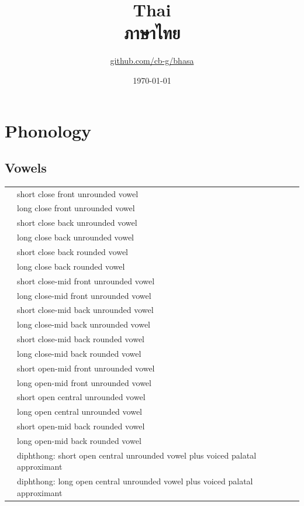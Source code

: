 \documentclass{article}
\title{Thai\\{\thaifont ภาษาไทย}\\\ipa{[p\super ha:\tone{333}sa:\tone{324}t\super haj\tone{333}]}}
\author{\href{https://github.com/cb-g/bhasa}{github.com/cb-g/bhasa}}
\date{\today}
\begin{document}
\pagecolor{custom_bg}\color{custom_fg}
\maketitle\thispagestyle{empty}

\newpage\setcounter{page}{1}\section{Phonology}

\subsection{Vowels}

\begin{xltabular}{\textwidth}{lL}
   & short close front unrounded vowel \\
   & long close front unrounded vowel \\
   & short close back unrounded vowel \\
   & long close back unrounded vowel \\
   & short close back rounded vowel \\
   & long close back rounded vowel \\
   & short close-mid front unrounded vowel \\
   & long close-mid front unrounded vowel \\
   & short close-mid back unrounded vowel \\
   & long close-mid back unrounded vowel \\
   & short close-mid back rounded vowel \\
   & long close-mid back rounded vowel \\
   & short open-mid front unrounded vowel \\
   & long open-mid front unrounded vowel \\
   & short open central unrounded vowel \\
   & long open central unrounded vowel \\
   & short open-mid back rounded vowel \\
   & long open-mid back rounded vowel \\
   & diphthong: short open central unrounded vowel plus voiced palatal approximant \\
   & diphthong: long open central unrounded vowel plus voiced palatal approximant \\

\end{xltabular}
\end{document}
